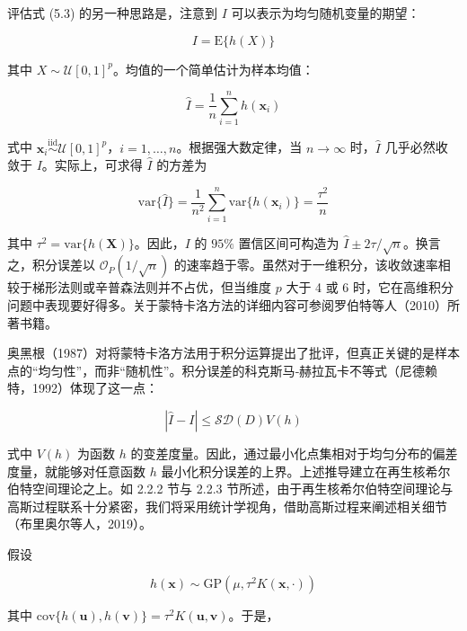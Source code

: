 \documentclass{ctexart}
\begin{document}
评估式 (5.3) 的另一种思路是，注意到 $I$ 可以表示为均匀随机变量的期望：

\begin{equation*}
I = \mathrm{E}\{h(X)\}
\end{equation*}

其中 $X \sim \mathcal{U}[0,1]^p$。均值的一个简单估计为样本均值：

\begin{equation*}
\widehat{I} = \frac{1}{n}\sum_{i=1}^{n}h(\boldsymbol{x}_i)
\end{equation*}

式中 $\boldsymbol{x}_i \stackrel{\text{iid}}{\sim} \mathcal{U}[0,1]^p$，$i = 1,\dots,n$。根据强大数定律，当 $n \to \infty$ 时，$\widehat{I}$ 几乎必然收敛于 $I$。实际上，可求得 $\widehat{I}$ 的方差为

\begin{equation*}
\mathrm{var}\{\widehat{I}\} = \frac{1}{n^2}\sum_{i=1}^{n}\mathrm{var}\{h(\boldsymbol{x}_i)\} = \frac{\tau^2}{n}
\end{equation*}

其中 $\tau^2 = \mathrm{var}\{h(\boldsymbol{X})\}$。因此，$I$ 的 $95\%$ 置信区间可构造为 $\widehat{I} \pm 2\tau/\sqrt{n}$。换言之，积分误差以 $\mathcal{O}_P(1/\sqrt{n})$ 的速率趋于零。虽然对于一维积分，该收敛速率相较于梯形法则或辛普森法则并不占优，但当维度 $p$ 大于 4 或 6 时，它在高维积分问题中表现要好得多。关于蒙特卡洛方法的详细内容可参阅罗伯特等人（2010）所著书籍。

奥黑根（1987）对将蒙特卡洛方法用于积分运算提出了批评，但真正关键的是样本点的“均匀性”，而非“随机性”。积分误差的科克斯马‑赫拉瓦卡不等式（尼德赖特，1992）体现了这一点：

\begin{equation*}
|\widehat{I}-I| \le \mathcal{S}\mathcal{D}(D)V(h)
\end{equation*}

式中 $V(h)$ 为函数 $h$ 的变差度量。因此，通过最小化点集相对于均匀分布的偏差度量，就能够对任意函数 $h$ 最小化积分误差的上界。上述推导建立在再生核希尔伯特空间理论之上。如 2.2.2 节与 2.2.3 节所述，由于再生核希尔伯特空间理论与高斯过程联系十分紧密，我们将采用统计学视角，借助高斯过程来阐述相关细节（布里奥尔等人，2019）。

假设

\begin{equation*}
h(\boldsymbol{x})\sim\mathrm{GP}(\mu,\tau^2K(\boldsymbol{x},\cdot))
\end{equation*}

其中 $\mathrm{cov}\{h(\boldsymbol{u}),h(\boldsymbol{v})\}=\tau^2K(\boldsymbol{u},\boldsymbol{v})$。于是，
\end{document}
